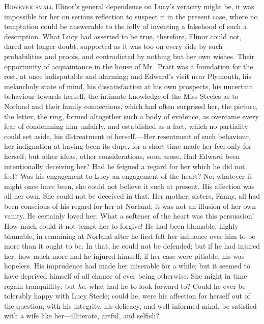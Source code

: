 \documentclass{article}
\newcommand{\gintro}[1]{\textcolor{gcolor}{\textsc{#1}}}
\begin{document}
\gintro{However small} Elinor's general dependence on
Lucy's veracity might be, it was impossible for her
on serious reflection to suspect it in the present case,
where no temptation could be answerable to the folly
of inventing a falsehood of such a description.  What Lucy
had asserted to be true, therefore, Elinor could not,
dared not longer doubt; supported as it was too on every
side by such probabilities and proofs, and contradicted
by nothing but her own wishes.  Their opportunity of
acquaintance in the house of Mr.\ Pratt was a foundation
for the rest, at once indisputable and alarming; and Edward's
visit near Plymouth, his melancholy state of mind,
his dissatisfaction at his own prospects, his uncertain
behaviour towards herself, the intimate knowledge of the
Miss Steeles as to Norland and their family connections,
which had often surprised her, the picture, the letter,
the ring, formed altogether such a body of evidence,
as overcame every fear of condemning him unfairly,
and established as a fact, which no partiality could
set aside, his ill-treatment of herself.---Her resentment
of such behaviour, her indignation at having been its dupe,
for a short time made her feel only for herself;
but other ideas, other considerations, soon arose.
Had Edward been intentionally deceiving her?  Had he feigned
a regard for her which he did not feel?  Was his engagement
to Lucy an engagement of the heart?  No; whatever it might
once have been, she could not believe it such at present.
His affection was all her own.  She could not be deceived
in that.  Her mother, sisters, Fanny, all had been
conscious of his regard for her at Norland; it was not
an illusion of her own vanity.  He certainly loved her.
What a softener of the heart was this persuasion!  How much
could it not tempt her to forgive!  He had been blamable,
highly blamable, in remaining at Norland after he first
felt her influence over him to be more than it ought
to be.  In that, he could not be defended; but if he
had injured her, how much more had he injured himself;
if her case were pitiable, his was hopeless.
His imprudence had made her miserable for a while; but it
seemed to have deprived himself of all chance of ever
being otherwise.  She might in time regain tranquillity;
but \emph{he}, what had he to look forward to?  Could he
ever be tolerably happy with Lucy Steele; could he,
were his affection for herself out of the question,
with his integrity, his delicacy, and well-informed mind,
be satisfied with a wife like her---illiterate, artful,
and selfish?
\end{document}
